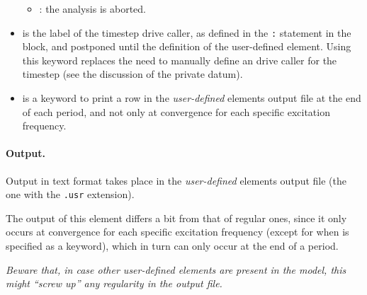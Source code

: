 \begin{itemize}
\begin{itemize}
\item {}: the analysis is aborted.
\end{itemize}

\item {} is the label of the timestep drive caller, as defined in the \texttt{:}  statement in the  block, and postponed until the definition of the user-defined element.
Using this keyword replaces the need to manually define an  drive caller for the timestep
(see the discussion of the  private datum).

\item {} is a keyword to print a row in the \emph{user-defined} elements output file at the end of each period, and not only at convergence for each specific excitation frequency.
\end{itemize}

\paragraph{Output.}\label{hfelem_output}
Output in text format takes place in the \emph{user-defined} elements output file (the one with the \texttt{.usr} extension).

The output of this element differs a bit from that of regular ones, since it only occurs at convergence for each specific excitation frequency (except for when  is specified as a keyword), which in turn can only occur at the end of a period.

\bigskip

\begin{framed}
\noindent
\emph{Beware that, in case other user-defined elements are present in the model, this might ``screw up'' any regularity in the output file.}
\end{framed}

\bigskip

